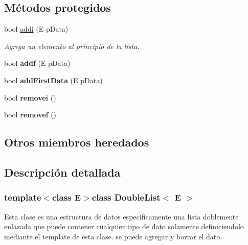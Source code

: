 \subsection*{Métodos protegidos}
\begin{DoxyCompactItemize}
\item 
bool \hyperlink{classDoubleList_a01623cc4b04d94c655de62ae373963b2}{addi} (E p\-Data)
\begin{DoxyCompactList}\small\item\em Agrega un elemento al principio de la lista. \end{DoxyCompactList}\item 
\hypertarget{classDoubleList_a495cbf66dc7f7523e15405b762cc616d}{bool {\bfseries addf} (E p\-Data)}\label{classDoubleList_a495cbf66dc7f7523e15405b762cc616d}

\item 
\hypertarget{classDoubleList_a4d72bc061da9183185b9ae1896b2767b}{bool {\bfseries add\-First\-Data} (E p\-Data)}\label{classDoubleList_a4d72bc061da9183185b9ae1896b2767b}

\item 
\hypertarget{classDoubleList_a074473aaac863a9e00ec34c2316a2d9e}{bool {\bfseries removei} ()}\label{classDoubleList_a074473aaac863a9e00ec34c2316a2d9e}

\item 
\hypertarget{classDoubleList_a0cd7c06fa533e3f800778920346b8a7b}{bool {\bfseries removef} ()}\label{classDoubleList_a0cd7c06fa533e3f800778920346b8a7b}

\end{DoxyCompactItemize}
\subsection*{Otros miembros heredados}


\subsection{Descripción detallada}
\subsubsection*{template$<$class E$>$class Double\-List$<$ E $>$}

Esta clase es una estructura de datos especificamente una lista doblemente enlazada que puede contener cualquier tipo de dato solamente definiciendolo mediante el template de esta clase. se puede agregar y borrar el dato. 

